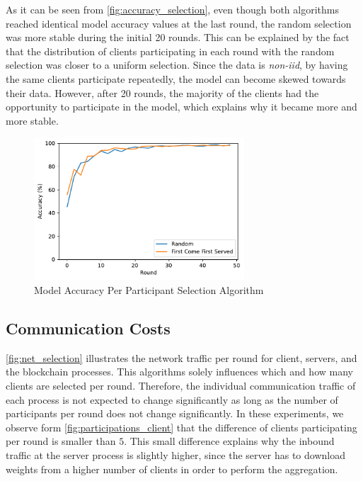 As it can be seen from \autoref{fig:accuracy_selection}, even though both algorithms reached identical model accuracy values at the last round, the random selection was more stable during the initial 20 rounds. This can be explained by the fact that the distribution of clients participating in each round with the random selection was closer to a uniform selection. Since the data is \textit{non-iid}, by having the same clients participate repeatedly, the model can become skewed towards their data. However, after 20 rounds, the majority of the clients had the opportunity to participate in the model, which explains why it became more and more stable.

\begin{figure}[!ht]
    \centering
    \centering
    \includegraphics[width=0.7\textwidth]{graphics/selection/accuracy.pdf}
    \caption{Model Accuracy Per Participant Selection Algorithm}
    \label{fig:accuracy_selection}
\end{figure}

\subsection{Communication Costs}

\autoref{fig:net_selection} illustrates the network traffic per round for client, servers, and the blockchain processes. This algorithms solely influences which and how many clients are selected per round. Therefore, the individual communication traffic of each process is not expected to change significantly as long as the number of participants per round does not change significantly. In these experiments, we observe form \autoref{fig:participations_client} that the difference of clients participating per round is smaller than $5$. This small difference explains why the inbound traffic at the server process is slightly higher, since the server has to download weights from a higher number of clients in order to perform the aggregation.

